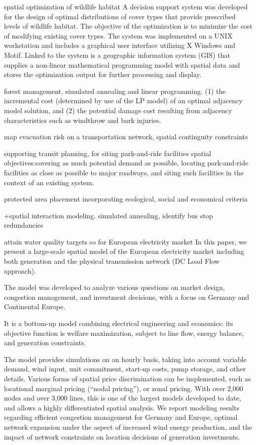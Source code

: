 \documentclass[12pt]{caltech_thesis}
\begin{document}
\begin{bibunit}
\citep{nevo1996spatial} spatial optimization of wildlife habitat
A decision support system was developed for the design of optimal distributions of cover types that provide prescribed levels of wildlife habitat. The objective of the optimization is to minimize the cost of modifying existing cover types. The system was implemented on a UNIX workstation and includes a graphical user interface utilizing X Windows and Motif. Linked to the system is a geographic information system (GIS) that supplies a non-linear mathematical programming model with spatial data and stores the optimization output for further processing and display.

\citep{tarp1997spatial} forest management, simulated annealing and linear programming. (1) the incremental cost (determined by use of the LP model) of an optimal adjacency model solution, and (2) the potential damage cost resulting from adjacency characteristics such as windthrow and bark injuries.


\citep{church2000mapping} map evacuation risk on a transportation network, spatial continguity constraints

\citep{farhan2008siting} supporting transit planning, for siting park-and-ride facilities
spatial objectives:covering as much potential demand as possible, locating park-and-ride facilities as close as possible to major roadways, and siting such facilities in the context of an existing system.

\citep{christensen2009spatial} protected area placement incorporating ecological, social and economical criteria

\cite{delmelle2012identifying} +spatial interaction modeling. simulated annealing, identify bus stop redundancies

\citep{gaddis2014spatial} attain water quality targets
\citep{leuthold2012large} so for European electricity market
In this paper, we present a large-scale spatial model of the European electricity market including both generation and the physical transmission network (DC Load Flow approach). 

The model was developed to analyze various questions on market design, congestion management, and investment decisions, with a focus on Germany and Continental Europe. 

It is a bottom-up model combining electrical engineering and economics: its objective function is welfare maximization, subject to line flow, energy balance, and generation constraints. 

The model provides simulations on an hourly basis, taking into account variable demand, wind input, unit commitment, start-up costs, pump storage, and other details. Various forms of spatial price discrimination can be implemented, such as locational marginal pricing (“nodal pricing”), or zonal pricing. With over 2,000 nodes and over 3,000 lines, this is one of the largest models developed to date, and allows a highly differentiated spatial analysis. We report modeling results regarding efficient congestion management for Germany and Europe, optimal network expansion under the aspect of increased wind energy production, and the impact of network constraints on location decisions of generation investments.


\end{bibunit}
\end{document}
